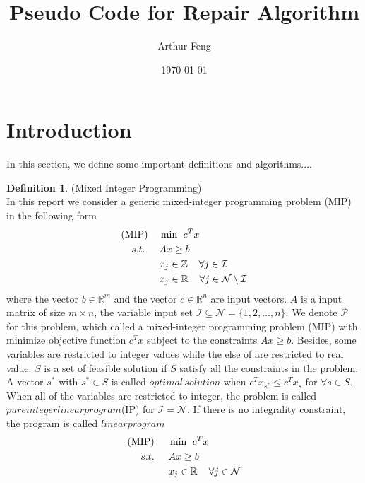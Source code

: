 \documentclass[11pt]{article}
\title{Pseudo Code for Repair Algorithm}
\author{Arthur Feng}
\date{\today}
\theoremstyle{definition}
\newtheorem{definition}{Definition}[section] %
\begin{document}
\maketitle

\section{Introduction}
In this section, we define some important definitions and algorithms....
\begin{definition}
(Mixed Integer Programming)\\
In this report we consider a generic mixed-integer programming problem (MIP) in the following form
	\begin{align*}
	\text{(MIP)} \hspace{4mm} &\min \hspace{1.5mm}c^Tx \\
	s.t.\hspace{5mm} &Ax \geq b \\
	&x_j \in \mathbb{Z} \hspace{4mm} \forall j \in \mathcal{I}\\
	&x_j \in \mathbb{R} \hspace{4mm} \forall j \in \mathcal{N} \setminus \mathcal{I}\\
	\end{align*}
where the vector $b \in \mathbb{R}^m$ and the vector $c \in \mathbb{R}^n$ are input vectors.   $A$ is a input matrix of size $m \times n$, the variable input set $\mathcal{I} \subseteq \mathcal{N} = \lbrace 1,2,\dots,n\rbrace$. We denote $\mathcal{P}$ for this problem, which called a mixed-integer programming problem (MIP) with minimize objective function $c^Tx$ subject to the constraints $Ax \geq b$. Besides, some variables are restricted to integer values while the else of are restricted to real value. $S$ is a set of feasible solution if $S$ satisfy all the constraints in the problem. A vector $s^*$ with $s^* \in  S $ is called $optimal \, solution$ when $c^Tx_{s^*} \leq c^Tx_{s} \text{ for } \forall s \in S$.
When all of the variables are restricted to integer, the problem is called $pure integer linear program$(IP) for $\mathcal{I} = \mathcal{N}$. If there is no  integrality constraint, the program is called $linear program$
	\begin{align*}
	\text{(MIP)} \hspace{5mm} &\min \hspace{1.5mm}c^Tx \\
	s.t.\hspace{5mm} &Ax \geq b \\
	&x_j \in \mathbb{R} \hspace{4mm} \forall j \in \mathcal{N} \\
	\end{align*}

\label{def_MIP}
\end{definition}
\end{document}
